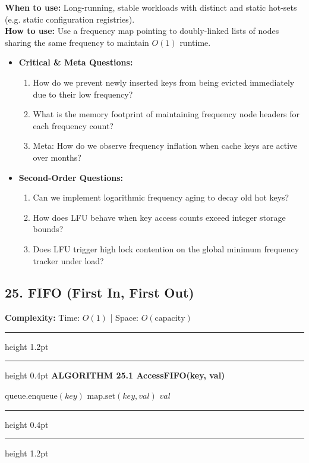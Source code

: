 \documentclass[11pt,a4paper]{article}
\newenvironment{textbookalgo}[2]{%
  \par\addvspace{1.2em}\noindent
  \hrule height 1.2pt
  \vspace{1.5pt}
  \hrule height 0.4pt
  \vspace{5pt}
  {\noindent\large\bfseries\sffamily ALGORITHM #1 \quad #2}
  \par\vspace{5pt}
  \RestyleAlgo{plain}
}{%
  \par\vspace{4pt}
  \hrule height 0.4pt
  \vspace{1.5pt}
  \hrule height 1.2pt
  \par\addvspace{1.2em}
}
\theoremstyle{definition}
\begin{document}
\noindent
\textbf{When to use:} Long-running, stable workloads with distinct and static hot-sets (e.g. static configuration registries).\\
\textbf{How to use:} Use a frequency map pointing to doubly-linked lists of nodes sharing the same frequency to maintain $O(1)$ runtime.
\begin{itemize}[leftmargin=*]
  \item[] \textbf{Critical \& Meta Questions:}
  \begin{enumerate}
    \item How do we prevent newly inserted keys from being evicted immediately due to their low frequency?
    \item What is the memory footprint of maintaining frequency node headers for each frequency count?
    \item Meta: How do we observe frequency inflation when cache keys are active over months?
  \end{enumerate}
  \item[] \textbf{Second-Order Questions:}
  \begin{enumerate}
    \item Can we implement logarithmic frequency aging to decay old hot keys?
    \item How does LFU behave when key access counts exceed integer storage bounds?
    \item Does LFU trigger high lock contention on the global minimum frequency tracker under load?
  \end{enumerate}
\end{itemize}
\medskip


\clearpage
\subsection{25. FIFO (First In, First Out)}

\noindent
\textbf{Complexity:} Time: $O(1)$ | Space: $O(\text{capacity})$
\smallskip

\begin{textbookalgo}{25.1}{AccessFIFO(key, val)}
\begin{algorithm}[H]
$\text{queue.enqueue}(key)$\;
$\text{map.set}(key, val)$\;
\Return $val$\;
\end{algorithm}
\end{textbookalgo}
\end{document}
